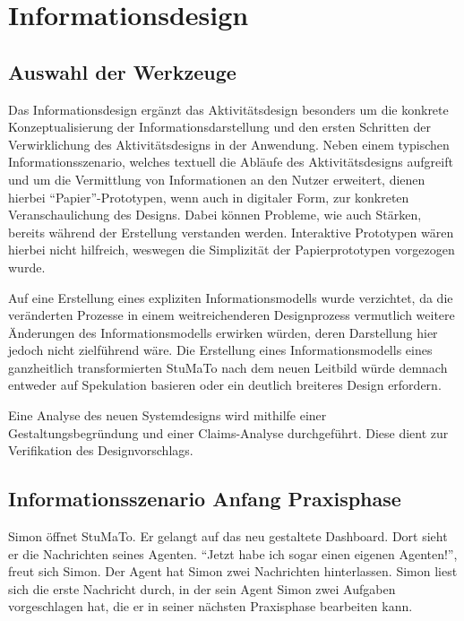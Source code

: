 \documentclass[
  12pt,
  ngerman,
  a4paper,
]{article}
\begin{document}
\hypertarget{informationsdesign}{%
\section{Informationsdesign}\label{informationsdesign}}

\hypertarget{auswahl-der-werkzeuge-1}{%
\subsection{Auswahl der Werkzeuge}\label{auswahl-der-werkzeuge-1}}

Das Informationsdesign ergänzt das Aktivitätsdesign besonders um die
konkrete Konzeptualisierung der Informationsdarstellung und den ersten
Schritten der Verwirklichung des Aktivitätsdesigns in der Anwendung.
Neben einem typischen Informationsszenario, welches textuell die Abläufe
des Aktivitätsdesigns aufgreift und um die Vermittlung von Informationen
an den Nutzer erweitert, dienen hierbei ``Papier''-Prototypen, wenn auch
in digitaler Form, zur konkreten Veranschaulichung des Designs. Dabei
können Probleme, wie auch Stärken, bereits während der Erstellung
verstanden werden. Interaktive Prototypen wären hierbei nicht hilfreich,
weswegen die Simplizität der Papierprototypen vorgezogen wurde.

Auf eine Erstellung eines expliziten Informationsmodells wurde
verzichtet, da die veränderten Prozesse in einem weitreichenderen
Designprozess vermutlich weitere Änderungen des Informationsmodells
erwirken würden, deren Darstellung hier jedoch nicht zielführend wäre.
Die Erstellung eines Informationsmodells eines ganzheitlich
transformierten StuMaTo nach dem neuen Leitbild würde demnach entweder
auf Spekulation basieren oder ein deutlich breiteres Design erfordern.

Eine Analyse des neuen Systemdesigns wird mithilfe einer
Gestaltungsbegründung und einer Claims-Analyse durchgeführt. Diese dient
zur Verifikation des Designvorschlags.

\hypertarget{informationsszenario-anfang-praxisphase}{%
\subsection{Informationsszenario Anfang
Praxisphase}\label{informationsszenario-anfang-praxisphase}}

Simon öffnet StuMaTo. Er gelangt auf das neu gestaltete Dashboard. Dort
sieht er die Nachrichten seines Agenten. ``Jetzt habe ich sogar einen
eigenen Agenten!'', freut sich Simon. Der Agent hat Simon zwei
Nachrichten hinterlassen. Simon liest sich die erste Nachricht durch, in
der sein Agent Simon zwei Aufgaben vorgeschlagen hat, die er in seiner
nächsten Praxisphase bearbeiten kann.
\end{document}
